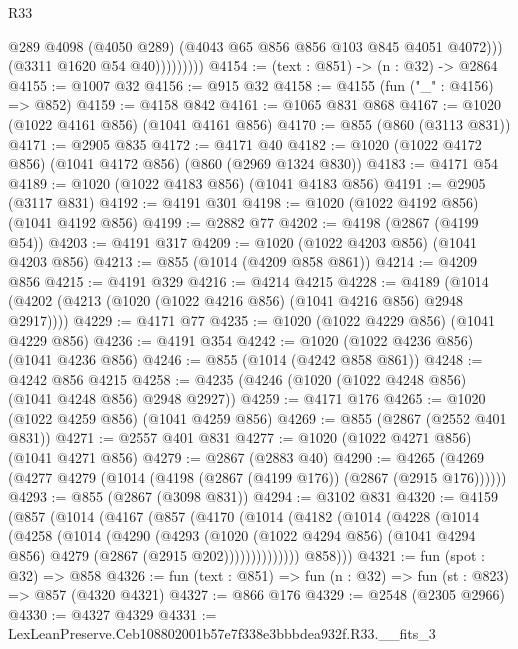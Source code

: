 \begin{lexlean}{R33}
\begin{coremodule}
                        @289
                        @4098
                        (@4050 @289)
                        (@4043 @65 @856 @856 @103 @845 @4051 @4072)))
                    (@3311 @1620 @54 @40)))))))))
@4154 := (text : @851) -> (n : @32) -> @2864
@4155 := @1007 @32
@4156 := @915 @32
@4158 := @4155 (fun ("_" : @4156) => @852)
@4159 := @4158 @842
@4161 := @1065 @831 @868
@4167 := @1020 (@1022 @4161 @856) (@1041 @4161 @856)
@4170 := @855 (@860 (@3113 @831))
@4171 := @2905 @835
@4172 := @4171 @40
@4182 := @1020 (@1022 @4172 @856) (@1041 @4172 @856) (@860 (@2969 @1324 @830))
@4183 := @4171 @54
@4189 := @1020 (@1022 @4183 @856) (@1041 @4183 @856)
@4191 := @2905 (@3117 @831)
@4192 := @4191 @301
@4198 := @1020 (@1022 @4192 @856) (@1041 @4192 @856)
@4199 := @2882 @77
@4202 := @4198 (@2867 (@4199 @54))
@4203 := @4191 @317
@4209 := @1020 (@1022 @4203 @856) (@1041 @4203 @856)
@4213 := @855 (@1014 (@4209 @858 @861))
@4214 := @4209 @856
@4215 := @4191 @329
@4216 := @4214 @4215
@4228 := @4189 (@1014 (@4202 (@4213 (@1020 (@1022 @4216 @856) (@1041 @4216 @856) @2948 @2917))))
@4229 := @4171 @77
@4235 := @1020 (@1022 @4229 @856) (@1041 @4229 @856)
@4236 := @4191 @354
@4242 := @1020 (@1022 @4236 @856) (@1041 @4236 @856)
@4246 := @855 (@1014 (@4242 @858 @861))
@4248 := @4242 @856 @4215
@4258 := @4235 (@4246 (@1020 (@1022 @4248 @856) (@1041 @4248 @856) @2948 @2927))
@4259 := @4171 @176
@4265 := @1020 (@1022 @4259 @856) (@1041 @4259 @856)
@4269 := @855 (@2867 (@2552 @401 @831))
@4271 := @2557 @401 @831
@4277 := @1020 (@1022 @4271 @856) (@1041 @4271 @856)
@4279 := @2867 (@2883 @40)
@4290 := @4265 (@4269 (@4277 @4279 (@1014 (@4198 (@2867 (@4199 @176)) (@2867 (@2915 @176))))))
@4293 := @855 (@2867 (@3098 @831))
@4294 := @3102 @831
@4320 := @4159
    (@857
      (@1014
        (@4167
          (@857
            (@4170
              (@1014
                (@4182
                  (@1014
                    (@4228
                      (@1014
                        (@4258
                          (@1014
                            (@4290
                              (@4293
                                (@1020
                                  (@1022 @4294 @856)
                                  (@1041 @4294 @856)
                                  @4279
                                  (@2867 (@2915 @202))))))))))))))
          @858)))
@4321 := fun (spot : @32) => @858
@4326 := fun (text : @851) => fun (n : @32) => fun (st : @823) => @857 (@4320 @4321)
@4327 := @866 @176
@4329 := @2548 (@2305 @2966)
@4330 := @4327 @4329
@4331 := LexLeanPreserve.Ceb108802001b57e7f338e3bbbdea932f.R33.__fits_3

\end{coremodule}
\end{lexlean}
